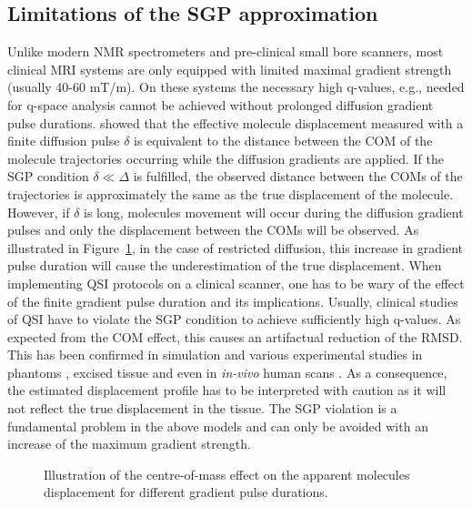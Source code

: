 \subsection{Limitations of the SGP approximation}
\label{sec:chapter2 limits of SGP}
Unlike modern NMR spectrometers and pre-clinical small bore scanners, most clinical MRI systems are only equipped with limited maximal gradient strength (usually 40-60 mT/m). On these systems the necessary high q-values, e.g., needed for q-space analysis cannot be achieved without prolonged diffusion gradient pulse durations. \citet{Mitra:1995} showed that the effective molecule displacement measured with a finite diffusion pulse $\delta$ is equivalent to the distance between the \gls{COM} of the molecule trajectories occurring while the diffusion gradients are applied. If the \gls{SGP} condition $ \delta \ll \Delta$ is fulfilled, the observed distance between the \glspl{COM} of the trajectories is approximately the same as the true displacement of the molecule. However, if $\delta$ is long, molecules movement will occur during the diffusion gradient pulses and only the displacement between the \gls{COM}s will be observed. As illustrated in Figure~\ref{fig:chapter2 com effect}, in the case of restricted diffusion, this increase in gradient pulse duration will cause the underestimation of the true displacement. 
When implementing QSI protocols on a clinical scanner, one has to be wary of the effect of the finite gradient pulse duration and its implications. Usually, clinical studies of QSI have to violate the \gls{SGP} condition to achieve sufficiently high q-values. As expected from the \gls{COM} effect, this causes an artifactual reduction of the \gls{RMSD}. This has been confirmed in simulation \citep{Linse:1995,Latt:2007a} and various experimental studies in phantoms \citep{Avram:2004,Latt:2007}, excised tissue \citep{Malmborg:2006,Bar-Shir:2008} and even in \emph{in-vivo} human scans \citep{Nilsson:2009}. As a consequence, the estimated displacement profile has to be interpreted with caution as it will not reflect the true displacement in the tissue. The \gls{SGP} violation is a fundamental problem in the above models and can only be avoided with an increase of the maximum gradient strength. 

\begin{figure}[htbp]
	\centering
	\caption{Illustration of the centre-of-mass effect on the apparent molecules displacement for different gradient pulse durations.}
	\label{fig:chapter2 com effect}
\end{figure}

